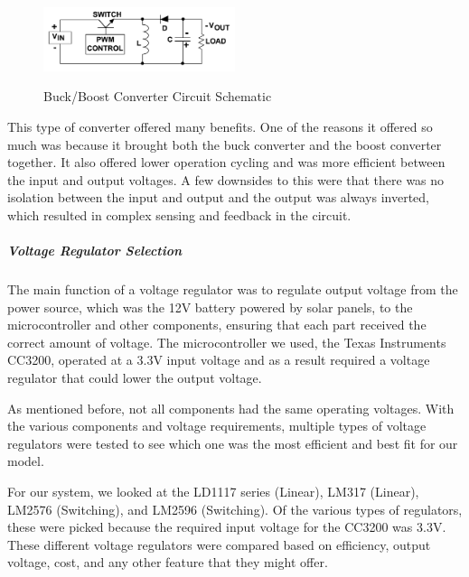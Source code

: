 \begin{figure}[H]
    \caption{Buck/Boost Converter Circuit Schematic}
    \centering
    \includegraphics[width=0.5\textwidth]{images/Buck_Boost_Converter.png}
    \label{fig:buck-boost-schematic}
\end{figure}
This type of converter offered many benefits. One of the reasons it offered so much was because it brought both the buck converter and the boost converter together. It also offered lower operation cycling and was more efficient between the input and output voltages. A few downsides to this were that there was no isolation between the input and output and the output was always inverted, which resulted in complex sensing and feedback in the circuit.
\subparagraph{Voltage Regulator Selection}
The main function of a voltage regulator was to regulate output voltage from the power source, which was the 12V battery powered by solar panels, to the microcontroller and other components, ensuring that each part received the correct amount of voltage. The microcontroller we used, the Texas Instruments CC3200, operated at a 3.3V input voltage and as a result required a voltage regulator that could lower the output voltage.

As mentioned before, not all components had the same operating voltages. With the various components and voltage requirements, multiple types of voltage regulators were tested to see which one was the most efficient and best fit for our model.

For our system, we looked at the LD1117 series (Linear), LM317 (Linear), LM2576 (Switching), and LM2596 (Switching). Of the various types of regulators, these were picked because the required input voltage for the CC3200 was 3.3V. These different voltage regulators were compared based on efficiency, output voltage, cost, and any other feature that they might offer.

